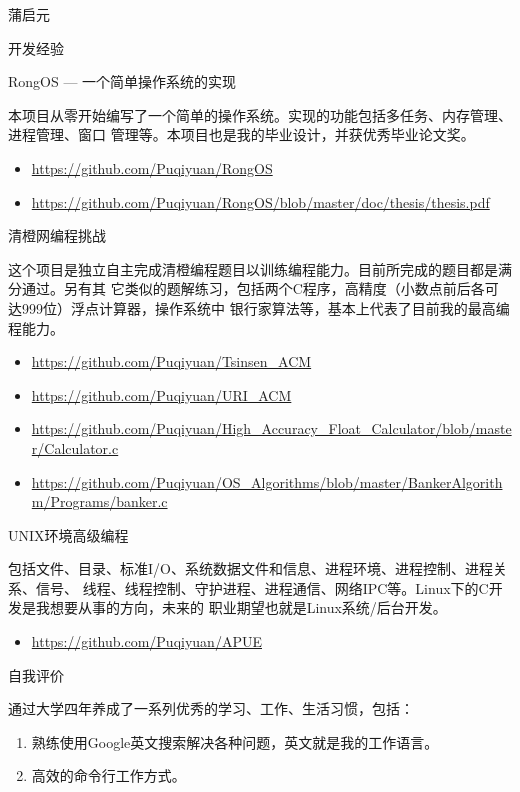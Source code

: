 \documentclass{wx672article} %
\begin{document}
\begin{cv}{蒲启元}
  \begin{cvlist}{开发经验}
  \item[RongOS --- 一个简单操作系统的实现]\ \par
    本项目从零开始编写了一个简单的操作系统。实现的功能包括多任务、内存管理、进程管理、窗口
    管理等。本项目也是我的毕业设计，并获优秀毕业论文奖。
    \begin{itemize}
    \item \url{https://github.com/Puqiyuan/RongOS}
    \item \url{https://github.com/Puqiyuan/RongOS/blob/master/doc/thesis/thesis.pdf}
    \end{itemize}
  \item[清橙网编程挑战] \ \par
    这个项目是独立自主完成清橙编程题目以训练编程能力。目前所完成的题目都是满分通过。另有其
    它类似的题解练习，包括两个C程序，高精度（小数点前后各可达999位）浮点计算器，操作系统中
    银行家算法等，基本上代表了目前我的最高编程能力。
    \begin{itemize}
    \item \url{https://github.com/Puqiyuan/Tsinsen_ACM}
    \item \url{https://github.com/Puqiyuan/URI_ACM}
    \item
      \url{https://github.com/Puqiyuan/High_Accuracy_Float_Calculator/blob/master/Calculator.c}
    \item
      \url{https://github.com/Puqiyuan/OS_Algorithms/blob/master/BankerAlgorithm/Programs/banker.c}
    \end{itemize}
  \item[UNIX环境高级编程] \ \par
    包括文件、目录、标准I/O、系统数据文件和信息、进程环境、进程控制、进程关系、信号、
    线程、线程控制、守护进程、进程通信、网络IPC等。Linux下的C开发是我想要从事的方向，未来的
    职业期望也就是Linux系统/后台开发。
    \begin{itemize}
    \item \url{https://github.com/Puqiyuan/APUE}
    \end{itemize}
  \end{cvlist}
  \begin{cvlist}{自我评价}
  \item[] 通过大学四年养成了一系列优秀的学习、工作、生活习惯，包括：
    \begin{enumerate}
    \item 熟练使用Google英文搜索解决各种问题，英文就是我的工作语言。
    \item 高效的命令行工作方式。

\end{enumerate}
\end{cvlist}
\end{cv}
\end{document}
